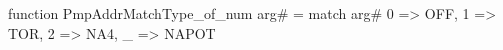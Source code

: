 function PmpAddrMatchType_of_num arg# = match arg# {
  0 => OFF,
  1 => TOR,
  2 => NA4,
  _ => NAPOT
}
